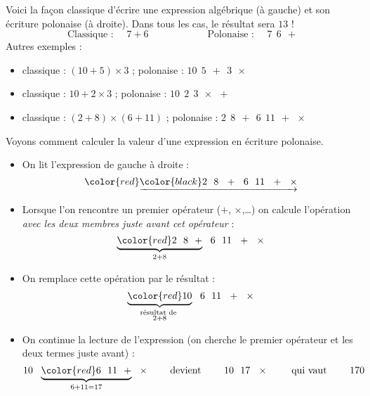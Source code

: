 \documentclass[11pt,class=report,crop=false]{standalone}
\begin{document}
\begin{cours}



Voici la façon classique d'écrire une expression algébrique (à gauche) et son écriture polonaise (à droite). Dans tous les cas, le résultat sera $13$ !
$$\text{Classique : } \quad 7 + 6 \qquad\qquad\qquad \text{Polonaise : } \quad 7 \ \ 6 \ \ +$$
Autres exemples :
\begin{itemize}
  \item 
  classique : $(10 + 5) \times 3$ \quad ; \quad
  polonaise : $10 \ \ 5 \ \ + \ \ 3 \ \ \times$
  
  \item 
  classique : $10 + 2 \times 3$ \quad ; \quad
  polonaise : $10 \ \ 2 \ \ 3 \ \ \times \ \ +$  
   
  \item 
  classique : $(2 + 8) \times (6 + 11)$ \quad ; \quad
  polonaise : $2 \ \ 8 \ \ + \ \ 6 \ \ 11 \ \ + \ \ \times$ 
\end{itemize}

\bigskip

Voyons comment calculer la valeur d'une expression en écriture polonaise. 
\begin{itemize}
  \item On lit l'expression de gauche à droite :
$$\color{red}\underrightarrow{\color{black}2 \ \ 8 \ \ + \ \ 6 \ \ 11 \ \ + \ \ \times}$$ 

  \item Lorsque l'on rencontre un premier opérateur ($+$, $\times$,\ldots) on calcule l'opération \emph{avec les deux membres juste avant cet opérateur} : 
$$\underbrace{\color{red}2 \ \ 8 \ \ +}_{2 + 8} \ \ 6 \ \ 11 \ \ + \ \ \times$$ 
   
  \item On remplace cette opération par le résultat :
$$\underbrace{\color{red} 10}_{\substack{\text{résultat de }\\2 + 8}} \ \ 6 \ \ 11 \ \ + \ \ \times$$
  
  \item On continue la lecture de l'expression (on cherche le premier opérateur et les deux termes juste avant) :
 $$10 \ \ \underbrace{\color{red}6 \ \ 11 \ \ +}_{6 + 11 = 17}  \ \ \times
 \qquad \text{ devient } \qquad 
10 \ \ 17  \ \ \times  \qquad \text{ qui vaut } \qquad 170$$
  

\end{itemize}
\end{cours}
\end{document}
